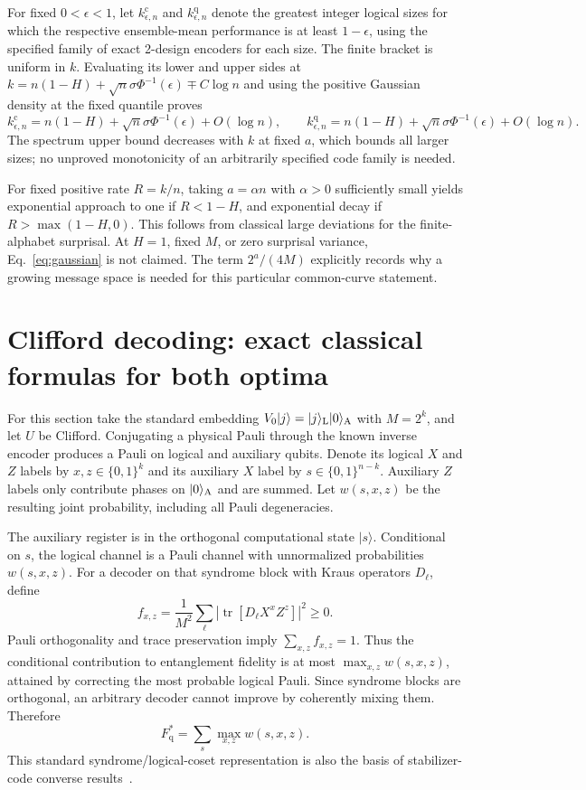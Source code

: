 \documentclass[aps,prl,onecolumn,superscriptaddress,amsmath,amssymb]{revtex4-2}
\newcommand{\tr}{\operatorname{tr}}
\newcommand{\Fq}{F_{\mathrm q}^{*}}
\begin{document}
For fixed $0<\epsilon<1$, let $k_{\epsilon,n}^{\mathrm c}$ and $k_{\epsilon,n}^{\mathrm q}$ denote the greatest integer logical sizes for which the respective ensemble-mean performance is at least $1-\epsilon$, using the specified family of exact 2-design encoders for each size. The finite bracket is uniform in $k$. Evaluating its lower and upper sides at $k=n(1-H)+\sqrt n\sigma\Phi^{-1}(\epsilon)\mp C\log n$ and using the positive Gaussian density at the fixed quantile proves
\begin{equation}
k_{\epsilon,n}^{\mathrm c}=n(1-H)+\sqrt n\sigma\Phi^{-1}(\epsilon)+O(\log n),\qquad
k_{\epsilon,n}^{\mathrm q}=n(1-H)+\sqrt n\sigma\Phi^{-1}(\epsilon)+O(\log n).
\end{equation}
The spectrum upper bound decreases with $k$ at fixed $a$, which bounds all larger sizes; no unproved monotonicity of an arbitrarily specified code family is needed.

For fixed positive rate $R=k/n$, taking $a=\alpha n$ with $\alpha>0$ sufficiently small yields exponential approach to one if $R<1-H$, and exponential decay if $R>\max(1-H,0)$. This follows from classical large deviations for the finite-alphabet surprisal. At $H=1$, fixed $M$, or zero surprisal variance, Eq.~\eqref{eq:gaussian} is not claimed. The term $2^a/(4M)$ explicitly records why a growing message space is needed for this particular common-curve statement.

\section{Clifford decoding: exact classical formulas for both optima}

For this section take the standard embedding $V_0|j\rangle=|j\rangle_{\rm L}|0\rangle_{\rm A}$ with $M=2^k$, and let $U$ be Clifford. Conjugating a physical Pauli through the known inverse encoder produces a Pauli on logical and auxiliary qubits. Denote its logical $X$ and $Z$ labels by $x,z\in\{0,1\}^k$ and its auxiliary $X$ label by $s\in\{0,1\}^{n-k}$. Auxiliary $Z$ labels only contribute phases on $|0\rangle_{\rm A}$ and are summed. Let $w(s,x,z)$ be the resulting joint probability, including all Pauli degeneracies.

The auxiliary register is in the orthogonal computational state $|s\rangle$. Conditional on $s$, the logical channel is a Pauli channel with unnormalized probabilities $w(s,x,z)$. For a decoder on that syndrome block with Kraus operators $D_\ell$, define
\begin{equation}
f_{x,z}=\frac1{M^2}\sum_\ell|\tr[D_\ell X^xZ^z]|^2\ge0.
\end{equation}
Pauli orthogonality and trace preservation imply $\sum_{x,z}f_{x,z}=1$. Thus the conditional contribution to entanglement fidelity is at most $\max_{x,z}w(s,x,z)$, attained by correcting the most probable logical Pauli. Since syndrome blocks are orthogonal, an arbitrary decoder cannot improve by coherently mixing them. Therefore
\begin{equation}
\Fq=\sum_s\max_{x,z}w(s,x,z).
\label{eq:cliffordq}
\end{equation}
This standard syndrome/logical-coset representation is also the basis of stabilizer-code converse results~\cite{StabilizerConverse}.
\end{document}
